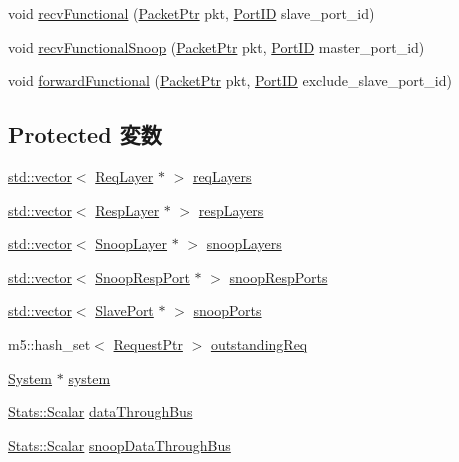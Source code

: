 \begin{DoxyCompactItemize}
\item 
void \hyperlink{classCoherentBus_a5cdfa7d369ba37394403d3c2bd5cf6d1}{recvFunctional} (\hyperlink{classPacket}{PacketPtr} pkt, \hyperlink{base_2types_8hh_acef4d7d41cb21fdc252e20c04cd7bb8e}{PortID} slave\_\-port\_\-id)
\item 
void \hyperlink{classCoherentBus_aab366eefcf6b389a308a63c82e7b3116}{recvFunctionalSnoop} (\hyperlink{classPacket}{PacketPtr} pkt, \hyperlink{base_2types_8hh_acef4d7d41cb21fdc252e20c04cd7bb8e}{PortID} master\_\-port\_\-id)
\item 
void \hyperlink{classCoherentBus_a45d5f60100921e96c8635b20cd9e9fab}{forwardFunctional} (\hyperlink{classPacket}{PacketPtr} pkt, \hyperlink{base_2types_8hh_acef4d7d41cb21fdc252e20c04cd7bb8e}{PortID} exclude\_\-slave\_\-port\_\-id)
\end{DoxyCompactItemize}
\subsection*{Protected 変数}
\begin{DoxyCompactItemize}
\item 
\hyperlink{classstd_1_1vector}{std::vector}$<$ \hyperlink{classBaseBus_1_1Layer}{ReqLayer} $\ast$ $>$ \hyperlink{classCoherentBus_ab124575386549f77de080cd9fcaf2ba0}{reqLayers}
\item 
\hyperlink{classstd_1_1vector}{std::vector}$<$ \hyperlink{classBaseBus_1_1Layer}{RespLayer} $\ast$ $>$ \hyperlink{classCoherentBus_a2f42dda70e78f1e5e9574f11b465d173}{respLayers}
\item 
\hyperlink{classstd_1_1vector}{std::vector}$<$ \hyperlink{classBaseBus_1_1Layer}{SnoopLayer} $\ast$ $>$ \hyperlink{classCoherentBus_ae6f8cf70846d8ee4b2314816863efbca}{snoopLayers}
\item 
\hyperlink{classstd_1_1vector}{std::vector}$<$ \hyperlink{classCoherentBus_1_1SnoopRespPort}{SnoopRespPort} $\ast$ $>$ \hyperlink{classCoherentBus_ae876574c554fa099bcd063e2e188b95b}{snoopRespPorts}
\item 
\hyperlink{classstd_1_1vector}{std::vector}$<$ \hyperlink{classSlavePort}{SlavePort} $\ast$ $>$ \hyperlink{classCoherentBus_acdbc947756de5f5071b88ce0702d557d}{snoopPorts}
\item 
m5::hash\_\-set$<$ \hyperlink{classRequest}{RequestPtr} $>$ \hyperlink{classCoherentBus_a8b5de6798515d1ac1236592c5ad7c521}{outstandingReq}
\item 
\hyperlink{classSystem}{System} $\ast$ \hyperlink{classCoherentBus_af27ccd765f13a4b7bd119dc7579e2746}{system}
\item 
\hyperlink{classStats_1_1Scalar}{Stats::Scalar} \hyperlink{classCoherentBus_a7040fa8d9fb24afb9f4fe245b135da19}{dataThroughBus}
\item 
\hyperlink{classStats_1_1Scalar}{Stats::Scalar} \hyperlink{classCoherentBus_a576c4936ce7bed70cd1751024670e75f}{snoopDataThroughBus}
\end{DoxyCompactItemize}


